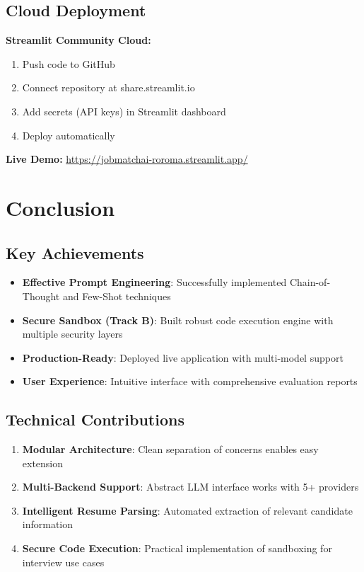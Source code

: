 \documentclass[12pt,a4paper]{article}
\begin{document}
\subsection{Cloud Deployment}

\textbf{Streamlit Community Cloud:}
\begin{enumerate}
    \item Push code to GitHub
    \item Connect repository at share.streamlit.io
    \item Add secrets (API keys) in Streamlit dashboard
    \item Deploy automatically
\end{enumerate}

\textbf{Live Demo:} \url{https://jobmatchai-roroma.streamlit.app/}

\section{Conclusion}

\subsection{Key Achievements}

\begin{itemize}
    \item \textbf{Effective Prompt Engineering}: Successfully implemented Chain-of-Thought and Few-Shot techniques
    \item \textbf{Secure Sandbox (Track B)}: Built robust code execution engine with multiple security layers
    \item \textbf{Production-Ready}: Deployed live application with multi-model support
    \item \textbf{User Experience}: Intuitive interface with comprehensive evaluation reports
\end{itemize}

\subsection{Technical Contributions}

\begin{enumerate}
    \item \textbf{Modular Architecture}: Clean separation of concerns enables easy extension
    \item \textbf{Multi-Backend Support}: Abstract LLM interface works with 5+ providers
    \item \textbf{Intelligent Resume Parsing}: Automated extraction of relevant candidate information
    \item \textbf{Secure Code Execution}: Practical implementation of sandboxing for interview use cases
\end{enumerate}
\end{document}
